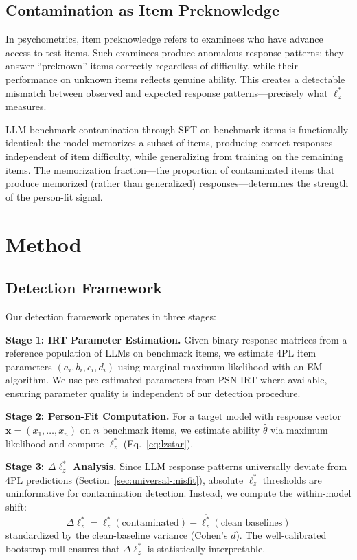 \documentclass[11pt,a4paper]{article}
\begin{document}
\subsection{Contamination as Item Preknowledge}

In psychometrics, item preknowledge refers to examinees who have advance access to test items.
Such examinees produce anomalous response patterns: they answer ``preknown'' items correctly regardless of difficulty, while their performance on unknown items reflects genuine ability.
This creates a detectable mismatch between observed and expected response patterns---precisely what $\ell_z^*$ measures.

LLM benchmark contamination through SFT on benchmark items is functionally identical: the model memorizes a subset of items, producing correct responses independent of item difficulty, while generalizing from training on the remaining items.
The memorization fraction---the proportion of contaminated items that produce memorized (rather than generalized) responses---determines the strength of the person-fit signal.

\section{Method}

\subsection{Detection Framework}

Our detection framework operates in three stages:

\textbf{Stage 1: IRT Parameter Estimation.}
Given binary response matrices from a reference population of LLMs on benchmark items, we estimate 4PL item parameters $(a_i, b_i, c_i, d_i)$ using marginal maximum likelihood with an EM algorithm.
We use pre-estimated parameters from PSN-IRT \citep{psnirt2026} where available, ensuring parameter quality is independent of our detection procedure.

\textbf{Stage 2: Person-Fit Computation.}
For a target model with response vector $\mathbf{x} = (x_1, \ldots, x_n)$ on $n$ benchmark items, we estimate ability $\hat{\theta}$ via maximum likelihood and compute $\ell_z^*$ (Eq.~\ref{eq:lzstar}).

\textbf{Stage 3: $\Delta\ell_z^*$ Analysis.}
Since LLM response patterns universally deviate from 4PL predictions (Section~\ref{sec:universal-misfit}), absolute $\ell_z^*$ thresholds are uninformative for contamination detection.
Instead, we compute the within-model shift:
\begin{equation}
\Delta\ell_z^* = \ell_z^*(\text{contaminated}) - \overline{\ell_z^*}(\text{clean baselines})
\end{equation}
standardized by the clean-baseline variance (Cohen's $d$).
The well-calibrated bootstrap null ensures that $\Delta\ell_z^*$ is statistically interpretable.
\end{document}

